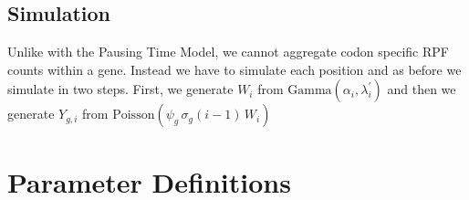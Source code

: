 \documentclass{article}
\newcommand{\alphai}{\ensuremath{{\alpha_i}}\xspace}
\newcommand{\lambdaiprime}{\ensuremath{{\lambda_i^\prime}}\xspace}
\newcommand{\sigmag}{\ensuremath{\sigma_{g}}\xspace}
\newcommand{\Ygi}{\ensuremath{{Y_{g,i}}}\xspace}
\begin{document}
\subsection*{Simulation}
Unlike with the Pausing Time Model, we cannot aggregate codon specific RPF counts within a gene.
Instead we have to simulate each position and as before we simulate in two steps.
First, we generate $W_i$  from $\text{Gamma}(\alphai, \lambdaiprime)$ and then we generate $\Ygi$ from $\text{Poisson}\left(\psi_g \, \sigmag(i-1)\, W_i\right)$


\section*{Parameter Definitions}
\label{paramDefs}
\setlength\tymin{30pt}  %
\end{document}
